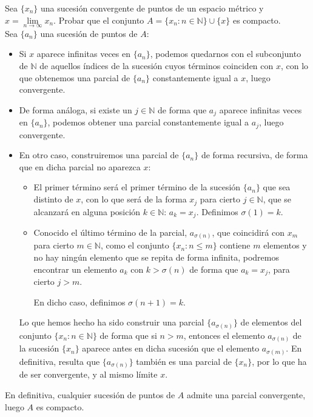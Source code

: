 \begin{ejercicio}
Sea \( \{x_n\} \) una sucesión convergente de puntos de un espacio métrico y \( x = \lim\limits_{n \to \infty} x_n \). Probar que el conjunto \( A = \{x_n : n \in \mathbb{N}\} \cup \{x\} \) es compacto.\\

\noindent
Sea $\{a_n\}$ una sucesión de puntos de $A$:
\begin{itemize}
    \item Si $x$ aparece infinitas veces en $\{a_n\}$, podemos quedarnos con el subconjunto de $\mathbb{N}$ de aquellos índices de la sucesión cuyos términos coinciden con $x$, con lo que obtenemos una parcial de $\{a_n\}$ constantemente igual a $x$, luego convergente. 
    \item De forma análoga, si existe un $j\in \mathbb{N}$ de forma que $a_j$ aparece infinitas veces en $\{a_n\}$, podemos obtener una parcial constantemente igual a $a_j$, luego convergente.
    \item En otro caso, construiremos una parcial de $\{a_n\}$ de forma recursiva, de forma que en dicha parcial no aparezca $x$:
        \begin{itemize}
            \item El primer término será el primer término de la sucesión $\{a_n\}$ que sea distinto de $x$, con lo que será de la forma $x_j$ para cierto $j\in \mathbb{N}$, que se alcanzará en alguna posición $k\in \mathbb{N}$: $a_k = x_j$. Definimos $\sigma(1) = k$.
            \item Conocido el último término de la parcial, $a_{\sigma(n)}$, que coincidirá con $x_m$ para cierto $m\in \mathbb{N}$, como el conjunto $\{x_n : n \leq m\}$ contiene $m$ elementos y no hay ningún elemento que se repita de forma infinita, podremos encontrar un elemento $a_k$ con $k > \sigma(n)$ de forma que $a_k = x_j$, para cierto $j>m$.

                En dicho caso, definimos $\sigma(n+1) = k$.
        \end{itemize}

        Lo que hemos hecho ha sido construir una parcial $\{a_{\sigma(n)}\}$ de elementos del conjunto $\{x_n : n\in \mathbb{N}\}$ de forma que si $n>m$, entonces el elemento $a_{\sigma(n)}$ de la sucesión $\{x_n\}$ aparece antes en dicha sucesión que el elemento $a_{\sigma(m)}$. En definitiva, resulta que $\{a_{\sigma(n)}\}$ también es una parcial de $\{x_n\}$, por lo que ha de ser convergente, y al mismo límite $x$.
\end{itemize}
En definitiva, cualquier sucesión de puntos de $A$ admite una parcial convergente, luego $A$ es compacto.
\end{ejercicio}

